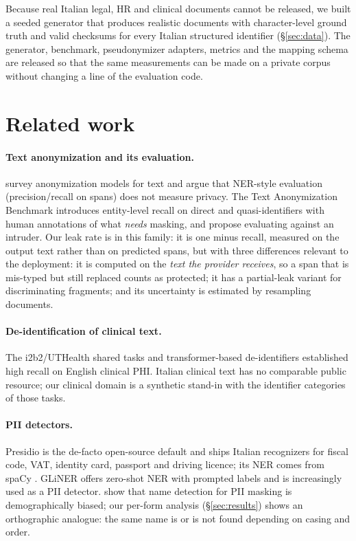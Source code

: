 \documentclass[11pt,a4paper]{article}
\begin{document}
Because real Italian legal, HR and clinical documents cannot be released, we built a seeded generator that produces realistic documents with character-level ground truth and valid checksums for every Italian structured identifier (\S\ref{sec:data}). The generator, benchmark, pseudonymizer adapters, metrics and the mapping schema are released so that the same measurements can be made on a private corpus without changing a line of the evaluation code.

\section{Related work}
\label{sec:related}

\paragraph{Text anonymization and its evaluation.} \citet{lison2021anonymisation} survey anonymization models for text and argue that NER-style evaluation (precision/recall on spans) does not measure privacy. The Text Anonymization Benchmark \citep{pilan2022tab} introduces entity-level recall on direct and quasi-identifiers with human annotations of what \emph{needs} masking, and \citet{mozes2021nointruder} propose evaluating against an intruder. Our leak rate is in this family: it is one minus recall, measured on the output text rather than on predicted spans, but with three differences relevant to the deployment: it is computed on the \emph{text the provider receives}, so a span that is mis-typed but still replaced counts as protected; it has a partial-leak variant for discriminating fragments; and its uncertainty is estimated by resampling documents.

\paragraph{De-identification of clinical text.} The i2b2/UTHealth shared tasks \citep{stubbs2015i2b2} and transformer-based de-identifiers \citep{johnson2020deid} established high recall on English clinical PHI. Italian clinical text has no comparable public resource; our clinical domain is a synthetic stand-in with the identifier categories of those tasks.

\paragraph{PII detectors.} Presidio \citep{presidio} is the de-facto open-source default and ships Italian recognizers for fiscal code, VAT, identity card, passport and driving licence; its NER comes from spaCy \citep{spacy_it}. GLiNER \citep{zaratiana2024gliner} offers zero-shot NER with prompted labels and is increasingly used as a PII detector. \citet{mansfield2022behind} show that name detection for PII masking is demographically biased; our per-form analysis (\S\ref{sec:results}) shows an orthographic analogue: the same name is or is not found depending on casing and order.
\end{document}
